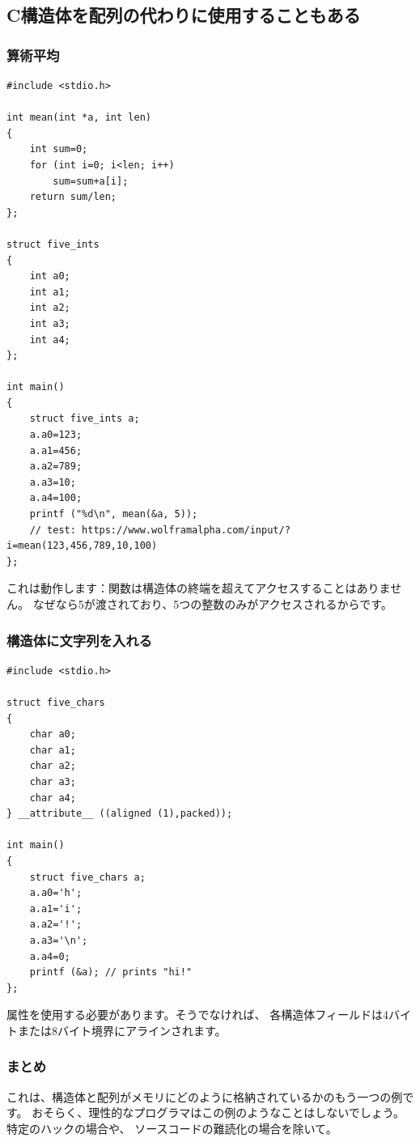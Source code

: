 \subsection{C構造体を配列の代わりに使用することもある}

\subsubsection{算術平均}

\begin{lstlisting}[style=customc]
#include <stdio.h>

int mean(int *a, int len)
{
	int sum=0;
	for (int i=0; i<len; i++)
		sum=sum+a[i];
	return sum/len;
};

struct five_ints
{
	int a0;
	int a1;
	int a2;
	int a3;
	int a4;
};

int main()
{
	struct five_ints a;
	a.a0=123;
	a.a1=456;
	a.a2=789;
	a.a3=10;
	a.a4=100;
	printf ("%d\n", mean(&a, 5));
	// test: https://www.wolframalpha.com/input/?i=mean(123,456,789,10,100)
};
\end{lstlisting}

これは動作します：関数は構造体の終端を超えてアクセスすることはありません。
なぜなら5が渡されており、5つの整数のみがアクセスされるからです。

\subsubsection{構造体に文字列を入れる}

\begin{lstlisting}[style=customc]
#include <stdio.h>

struct five_chars
{
	char a0;
	char a1;
	char a2;
	char a3;
	char a4;
} __attribute__ ((aligned (1),packed));

int main()
{
	struct five_chars a;
	a.a0='h';
	a.a1='i';
	a.a2='!';
	a.a3='\n';
	a.a4=0;
	printf (&a); // prints "hi!"
};
\end{lstlisting}

属性を使用する必要があります。そうでなければ、
各構造体フィールドは4バイトまたは8バイト境界にアラインされます。

\subsubsection{まとめ}

これは、構造体と配列がメモリにどのように格納されているかのもう一つの例です。
おそらく、理性的なプログラマはこの例のようなことはしないでしょう。特定のハックの場合や、
ソースコードの難読化の場合を除いて。